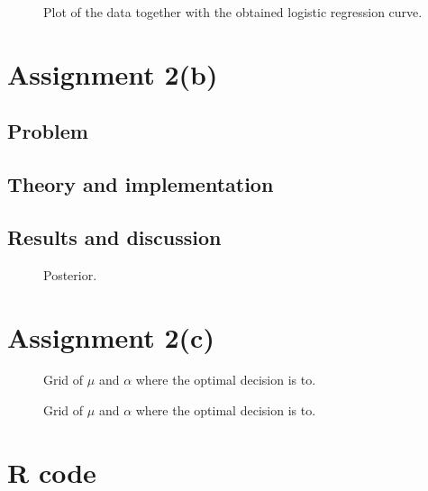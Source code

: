 \documentclass[11pt, a4paper]{article}
\begin{document}
\begin{figure}
	\centering
	
	\caption{Plot of the data together with the obtained logistic regression curve. \label{fig:logistic_regression}}
\end{figure}

\section{Assignment 2(b)}
\subsection{Problem}
\subsection{Theory and implementation}
\subsection{Results and discussion}

\begin{figure}
	\centering
	
	\caption{Posterior. \label{fig:posterior}}
\end{figure}

\section{Assignment 2(c)}

\begin{figure}
	\centering
	
	\caption{Grid of $\mu$ and $\alpha$ where the optimal decision is to.}
\end{figure}

\begin{figure}
	\centering
	
	\caption{Grid of $\mu$ and $\alpha$ where the optimal decision is to.}
\end{figure}

\clearpage
\appendix %

\section{R code}
% 
\end{document}
